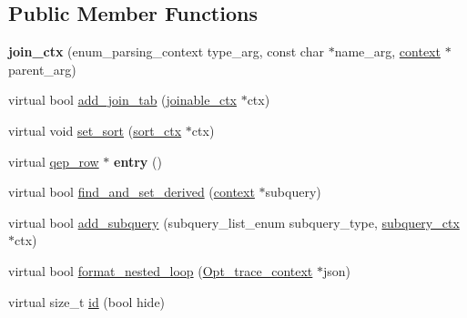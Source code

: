 \subsection*{Public Member Functions}
\begin{DoxyCompactItemize}
\item 
\mbox{\label{classopt__explain__json__namespace_1_1join__ctx_afdb5a41f014dc6be7d976a2df0c2bdb6}} 
{\bfseries join\+\_\+ctx} (enum\+\_\+parsing\+\_\+context type\+\_\+arg, const char $\ast$name\+\_\+arg, \mbox{\hyperlink{classopt__explain__json__namespace_1_1context}{context}} $\ast$parent\+\_\+arg)
\item 
virtual bool \mbox{\hyperlink{classopt__explain__json__namespace_1_1join__ctx_a2eec52e554d339b5f45630e7f8cf5d41}{add\+\_\+join\+\_\+tab}} (\mbox{\hyperlink{classopt__explain__json__namespace_1_1joinable__ctx}{joinable\+\_\+ctx}} $\ast$ctx)
\item 
virtual void \mbox{\hyperlink{classopt__explain__json__namespace_1_1join__ctx_a4da472e6a104b4e13dbc0a39450b4a95}{set\+\_\+sort}} (\mbox{\hyperlink{classopt__explain__json__namespace_1_1sort__ctx}{sort\+\_\+ctx}} $\ast$ctx)
\item 
\mbox{\label{classopt__explain__json__namespace_1_1join__ctx_a8581f21376fb5be32a60436640817465}} 
virtual \mbox{\hyperlink{classqep__row}{qep\+\_\+row}} $\ast$ {\bfseries entry} ()
\item 
virtual bool \mbox{\hyperlink{classopt__explain__json__namespace_1_1join__ctx_aa37b36787c204c852a8d7578459cfbc0}{find\+\_\+and\+\_\+set\+\_\+derived}} (\mbox{\hyperlink{classopt__explain__json__namespace_1_1context}{context}} $\ast$subquery)
\item 
virtual bool \mbox{\hyperlink{classopt__explain__json__namespace_1_1join__ctx_a5005892466618a6abcc3a5971c1d7433}{add\+\_\+subquery}} (subquery\+\_\+list\+\_\+enum subquery\+\_\+type, \mbox{\hyperlink{classopt__explain__json__namespace_1_1subquery__ctx}{subquery\+\_\+ctx}} $\ast$ctx)
\item 
virtual bool \mbox{\hyperlink{classopt__explain__json__namespace_1_1join__ctx_a83f0f4dde495c7ca7063692cbfbefbdf}{format\+\_\+nested\+\_\+loop}} (\mbox{\hyperlink{classOpt__trace__context}{Opt\+\_\+trace\+\_\+context}} $\ast$json)
\item 
virtual size\+\_\+t \mbox{\hyperlink{classopt__explain__json__namespace_1_1join__ctx_ab5a53a0661e15a3cfca73c0209038945}{id}} (bool hide)

\end{DoxyCompactItemize}
